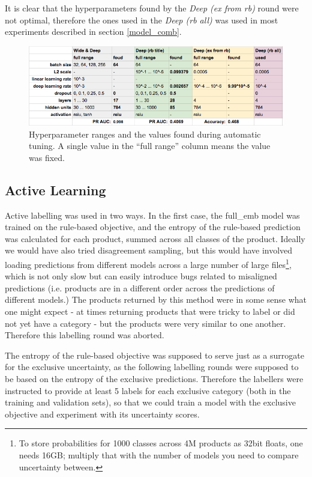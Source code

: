 It is clear that the hyperparameters found by the \textit{Deep (ex from rb)} round were not optimal, therefore the ones used in the \textit{Deep (rb all)} was used in most experiments described in section \ref{model_comb}.

\begin{figure}
  \includegraphics[width=\linewidth]{figures/tuning_rounds}
  \caption{Hyperparameter ranges and the values found during automatic tuning. A single value in the ``full range'' column means the value was fixed.}
  \label{tuning_rounds}
\end{figure}

\subsection{Active Learning}
\label{exp_al}

Active labelling was used in two ways.
In the first case, the full\_emb model was trained on the rule-based objective, and the entropy of the rule-based prediction was calculated for each product, summed across all classes of the product.
Ideally we would have also tried disagreement sampling, but this would have involved loading predictions from different models across a large number of large files\footnote{To store probabilities for 1000 classes across 4M products as 32bit floats, one needs 16GB; multiply that with the number of models you need to compare uncertainty between.}, which is not only slow but can easily introduce bugs related to misaligned predictions (i.e. products are in a different order across the predictions of different models.)
The products returned by this method were in some sense what one might expect - at times returning products that were tricky to label or did not yet have a category - but the products were very similar to one another. Therefore this labelling round was aborted.

The entropy of the rule-based objective was supposed to serve just as a surrogate for the exclusive uncertainty, as the following labelling rounds were supposed to be based on the entropy of the exclusive predictions.
Therefore the labellers were instructed to provide at least 5 labels for each exclusive category (both in the training and validation sets), so that we could train a model with the exclusive objective and experiment with its uncertainty scores.
